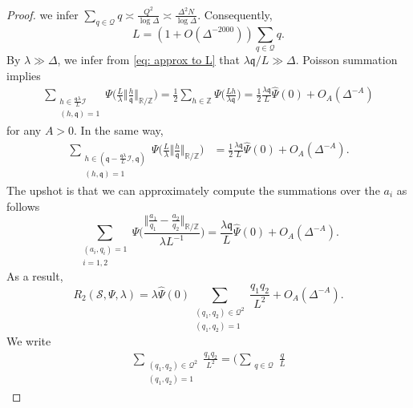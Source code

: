 \documentclass[10pt,a4paper]{amsart}
\begin{document}
\begin{proof}
we infer 
$\sum_{q\in \mathcal{Q}}  q \asymp \frac{Q^2}{\log \Delta}
\asymp \frac{\Delta^2 N}{\log \Delta} $.
Consequently,
\begin{equation}\label{eq: approx to L}
L= (1+ O(\Delta^{-2000})) \sum_{q\in \mathcal{Q}}  q.
\end{equation}
By $\lambda \gg \Delta$, we infer from
\eqref{eq: approx to L} that
$\lambda \mathfrak{q}/L\gg \Delta$.
Poisson summation implies
\begin{align*}
\sum_{\substack{h\in \frac{\mathfrak{q} \lambda}{L}\mathcal{I}\\
(h,\mathfrak{q})=1}}
\Psi\Big( \frac{L}{\lambda}\Big \Vert  
\frac{h}{\mathfrak{q}} \Big\Vert_{\mathbb{R}/\mathbb{Z}}\Big)
= 
\frac{1}{2}
\sum_{h\in \mathbb{Z}}
\Psi\Big(\frac{Lh}{\lambda\mathfrak{q}} \Big)
= \frac{1}{2} 
\frac{\lambda\mathfrak{q}}{L}
\widehat{\Psi}(0)
+ O_A(\Delta^{-A})
\end{align*}
for any $A>0$.
In the same way,
\begin{align*}
\sum_{\substack{h\in (\mathfrak{q}- 
\frac{\mathfrak{q} \lambda}{L}\mathcal{I}, \mathfrak{q})\\
(h,\mathfrak{q})=1}}
\Psi\Big(\frac{L}{\lambda} \Big \Vert  
\frac{h}{\mathfrak{q}} \Big\Vert_{\mathbb{R}/\mathbb{Z}}\Big)
& = \frac{1}{2} 
\frac{\lambda\mathfrak{q}}{L}
\widehat{\Psi}(0)
+ O_A(\Delta^{-A}).
\end{align*}
The upshot is that we can approximately compute the summations over the 
$a_i$ as follows
$$
\sum_{\substack{(a_i,q_i)=1\\
i=1,2}} 
\Psi\Bigg(\frac{\big \Vert \frac{a_1}{q_1} - 
\frac{a_2}{q_2} \big\Vert_{\mathbb{R}/\mathbb{Z}}}
{\lambda L^{-1}}\Bigg) = 
\frac{\lambda \mathfrak{q}}{L} \widehat{\Psi}(0) + O_A(\Delta^{-A}).
$$
As a result, 
\begin{equation}\label{eq circle method interm}
R_2(\mathcal{S},\Psi,\lambda)
= 
\lambda \widehat{\Psi}(0) 
\sum_{\substack{(q_1,q_2)\in \mathcal{Q}^2\\
(q_1,q_2)=1}}
\frac{q_1q_2}{L^2} + O_A(\Delta^{-A}).
\end{equation}
We write
\begin{align}\label{eq interm q sum}
\sum_{\substack{(q_1,q_2)\in \mathcal{Q}^2\\
(q_1,q_2)=1}} \frac{q_1q_2}{L^2}
= 
\Bigg(
\sum_{\substack{q\in \mathcal{Q}}} \frac{q}{L}

\end{align}
\end{proof}
\end{document}
